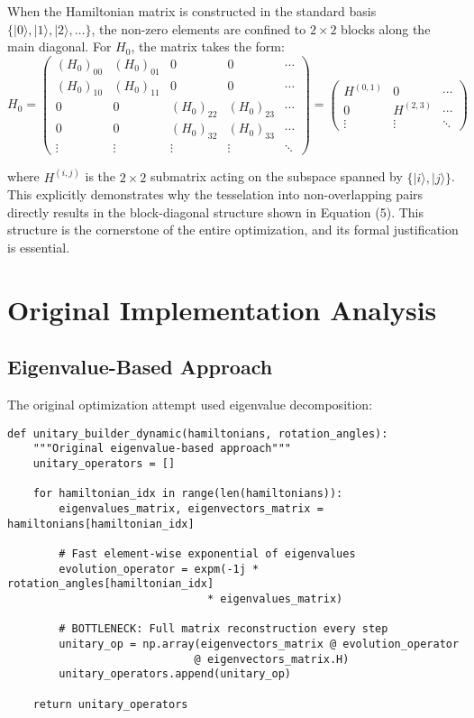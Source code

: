 \documentclass[11pt,a4paper]{article}
\begin{document}
{When the Hamiltonian matrix is constructed in the standard basis $\{|0\rangle, |1\rangle, |2\rangle, \ldots\}$, the non-zero elements are confined to $2\times2$ blocks along the main diagonal. For $H_0$, the matrix takes the form:
\begin{equation}
H_0 = \begin{pmatrix}
(H_0)_{00} & (H_0)_{01} & 0 & 0 & \cdots \\
(H_0)_{10} & (H_0)_{11} & 0 & 0 & \cdots \\
0 & 0 & (H_0)_{22} & (H_0)_{23} & \cdots \\
0 & 0 & (H_0)_{32} & (H_0)_{33} & \cdots \\
\vdots & \vdots & \vdots & \vdots & \ddots
\end{pmatrix} = \begin{pmatrix}
H^{(0,1)} & 0 & \cdots \\
0 & H^{(2,3)} & \cdots \\
\vdots & \vdots & \ddots
\end{pmatrix}
\end{equation}

where $H^{(i,j)}$ is the $2\times2$ submatrix acting on the subspace spanned by $\{|i\rangle, |j\rangle\}$. This explicitly demonstrates why the tesselation into non-overlapping pairs directly results in the block-diagonal structure shown in Equation (5). This structure is the cornerstone of the entire optimization, and its formal justification is essential.
}

\section{Original Implementation Analysis}

\subsection{Eigenvalue-Based Approach}

The original optimization attempt used eigenvalue decomposition:

\begin{lstlisting}[caption={Original eigenvalue-based implementation}, label={lst:original}]
def unitary_builder_dynamic(hamiltonians, rotation_angles):
    """Original eigenvalue-based approach"""
    unitary_operators = []

    for hamiltonian_idx in range(len(hamiltonians)):
        eigenvalues_matrix, eigenvectors_matrix = hamiltonians[hamiltonian_idx]
        
        # Fast element-wise exponential of eigenvalues
        evolution_operator = expm(-1j * rotation_angles[hamiltonian_idx] 
                               * eigenvalues_matrix)
        
        # BOTTLENECK: Full matrix reconstruction every step
        unitary_op = np.array(eigenvectors_matrix @ evolution_operator 
                             @ eigenvectors_matrix.H)
        unitary_operators.append(unitary_op)

    return unitary_operators
\end{lstlisting}
\end{document}
